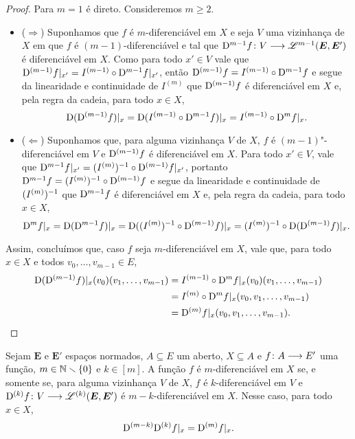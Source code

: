 \begin{proof}
Para $m=1$ é direto. Consideremos $m \geq 2$.
	\begin{itemize}
	\item ($\Rightarrow$) Suponhamos que $f$ é $m$-diferenciável em $X$ e seja $V$ uma vizinhança de $X$ em que $f$ é $(m-1)$-diferenciável e tal que $\mathrm{D}^{m-1} f\colon \allowbreak V \longrightarrow \mathscr{L}^{m-1}(\bm E, \bm E')$ é diferenciável em $X$. Como para todo $x' \in V$ vale que $\mathrm{D}^{(m-1)} f|_{x'} = I^{(m-1)} \circ \mathrm{D}^{m-1} f|_{x'}$, então $\mathrm{D}^{(m-1)} f = I^{(m-1)} \circ \mathrm{D}^{m-1} f$ e segue da linearidade e continuidade de $I^{(m)}$ que $\mathrm{D}^{(m-1)} f$ é diferenciável em $X$ e, pela regra da cadeia, para todo $x \in X$,
		\begin{equation*}
		\mathrm{D} (\mathrm{D}^{(m-1)} f)|_x = \mathrm{D} (I^{(m-1)} \circ \mathrm{D}^{m-1} f)|_x = I^{(m-1)} \circ \mathrm{D}^m f|_x.
		\end{equation*}

	\item ($\Leftarrow$) Suponhamos que, para alguma vizinhança $V$ de $X$, $f$ é $(m-1)$"-diferenciável em $V$ e $\mathrm{D}^{(m-1)} f$ é diferenciável em $X$. Para todo $x' \in V$, vale que $\mathrm{D}^{m-1} f|_{x'} = (I^{(m)})^{-1} \circ \mathrm{D}^{(m-1)} f|_{x'}$, portanto $\mathrm{D}^{m-1} f = (I^{(m)})^{-1} \circ \mathrm{D}^{(m-1)} f$ e segue da linearidade e continuidade de $(I^{(m)})^{-1}$ que $\mathrm{D}^{m-1} f$ é diferenciável em $X$ e, pela regra da cadeia, para todo $x \in X$,
		\begin{equation*}
		\mathrm{D}^m f|_x = \mathrm{D} (\mathrm{D}^{m-1} f)|_x = \mathrm{D} ((I^{(m)})^{-1} \circ \mathrm{D}^{(m-1)} f)|_x = (I^{(m)})^{-1} \circ \mathrm{D}(\mathrm{D}^{(m-1)} f)|_x.
		\end{equation*}
	\end{itemize}

Assim, concluímos que, caso $f$ seja $m$-diferenciável em $X$, vale que, para todo $x \in X$ e todos $v_0, \ldots, v_{m-1} \in E$,
	\begin{align*}
	\mathrm{D} (\mathrm{D}^{(m-1)} f)|_x(v_0) (v_1, \ldots, v_{m-1}) &= I^{(m-1)} \circ \mathrm{D}^m f|_x (v_0) (v_1, \ldots, v_{m-1}) \\
		&= I^{(m)} \circ \mathrm{D}^m f|_x (v_0, v_1, \ldots, v_{m-1}) \\
		&= \mathrm{D}^{(m)} f|_x (v_0, v_1, \ldots, v_{m-1}).
		\qedhere
	\end{align*}
\end{proof}

\begin{exercise}
Sejam $\bm E$ e $\bm E'$ espaços normados, $A \subseteq E$ um aberto, $X \subseteq A$ e $f\colon \allowbreak A \longrightarrow E'$ uma função, $m \in \mathbb{N} \smallsetminus \{0\}$ e $k \in [m]$. A função $f$ é $m$-diferenciável em $X$ se, e somente se, para alguma vizinhança $V$ de $X$, $f$ é $k$-diferenciável em $V$ e $\mathrm{D}^{(k)} f\colon \allowbreak V \longrightarrow \mathscr{L}^{(k)}(\bm E, \bm E')$ é $m-k$-diferenciável em $X$. Nesse caso, para todo $x \in X$,
	\begin{equation*}
	\mathrm{D}^{(m-k)}\mathrm{D}^{(k)} f|_x = \mathrm{D}^{(m)} f|_x.
	\end{equation*}

\end{exercise}


